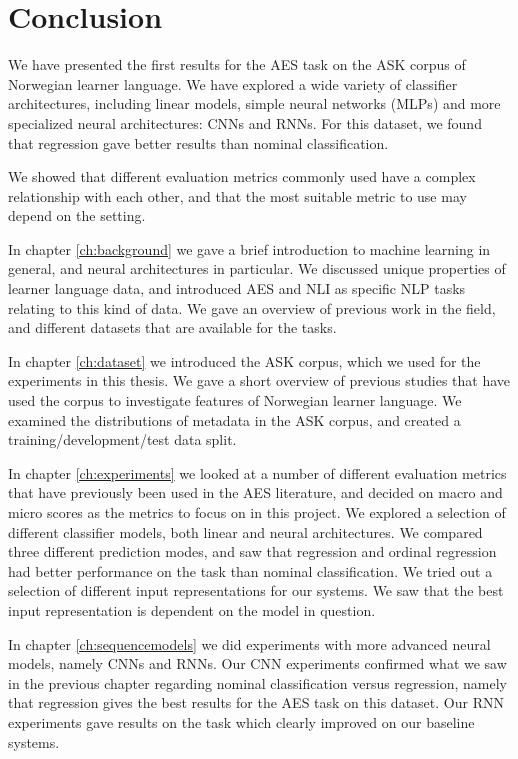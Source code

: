 \chapter{Conclusion} \label{ch:conclusion}

We have presented the first results for the \ac{AES} task on the ASK corpus
of Norwegian learner language. We have explored a wide variety of classifier
architectures, including linear models, simple neural networks (\acp{MLP})
and more specialized neural architectures: \acp{CNN} and \acp{RNN}. For this
dataset, we found that regression gave better results than nominal
classification.

We showed that different evaluation metrics commonly used have a complex
relationship with each other, and that the most suitable metric to use may
depend on the setting.

In chapter \ref{ch:background} we gave a brief introduction to machine
learning in general, and neural architectures in particular. We discussed
unique properties of learner language data, and introduced \ac{AES} and
\ac{NLI} as specific \ac{NLP} tasks relating to this kind of data. We gave an
overview of previous work in the field, and different datasets that are
available for the tasks.

In chapter \ref{ch:dataset} we introduced the ASK corpus, which we used for
the experiments in this thesis. We gave a short overview of previous studies
that have used the corpus to investigate features of Norwegian learner
language. We examined the distributions of metadata in the ASK corpus, and
created a training/development/test data split.

In chapter \ref{ch:experiments} we looked at a number of different evaluation
metrics that have previously been used in the \ac{AES} literature, and
decided on macro and micro \FI scores as the metrics to focus on in this
project. We explored a selection of different classifier models, both linear
and neural architectures. We compared three different prediction modes, and
saw that regression and ordinal regression had better performance on the task
than nominal classification. We tried out a selection of different input
representations for our systems. We saw that the best input representation is
dependent on the model in question.

In chapter \ref{ch:sequencemodels} we did experiments with more advanced
neural models, namely \acp{CNN} and \acp{RNN}. Our CNN experiments confirmed
what we saw in the previous chapter regarding nominal classification versus
regression, namely that regression gives the best results for the \ac{AES}
task on this dataset. Our \ac{RNN} experiments gave results on the task which
clearly improved on our baseline systems.

